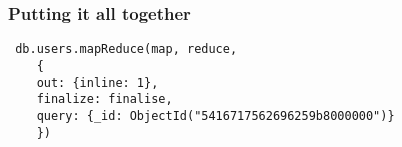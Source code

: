 \documentclass[10pt]{beamer}
\begin{document}
\begin{frame}[fragile]
  \frametitle{Putting it all together}

 \begin{verbatim}
 db.users.mapReduce(map, reduce,
    {
    out: {inline: 1},
    finalize: finalise,
    query: {_id: ObjectId("5416717562696259b8000000")}
    })
 \end{verbatim}

\end{frame}
\end{document}
